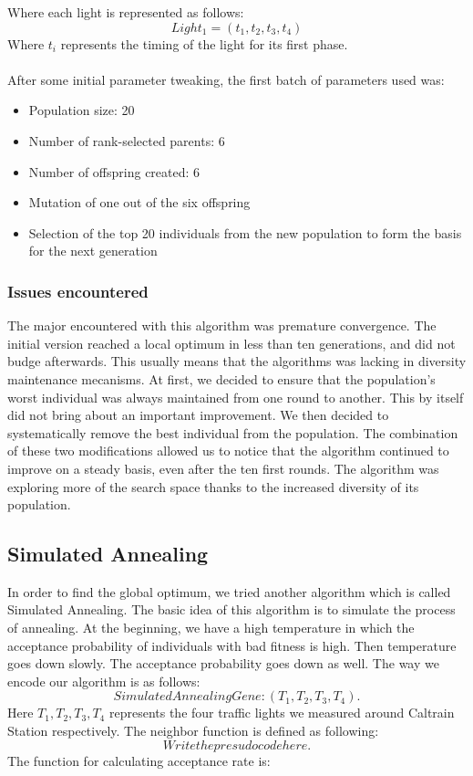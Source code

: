 \documentclass{article} %
\begin{document}
Where each light is represented as follows:
\begin{equation}
 Light_1 = (t_1, t_2, t_3, t_4)
\end{equation}
Where $t_i$ represents the timing of the light for its first phase. \\
$\;$\\
After some initial parameter tweaking, the first batch of parameters used was:
\begin{itemize}
 \item Population size: 20
 \item Number of rank-selected parents: 6
 \item Number of offspring created: 6
 \item Mutation of one out of the six offspring
 \item Selection of the top 20 individuals from the new population to form the basis for the next generation
\end{itemize}


\subsubsection{Issues encountered}
The major encountered with this algorithm was premature convergence. The initial version reached a local optimum in less than ten generations, and did not budge afterwards. This usually means that the algorithms was lacking in diversity maintenance mecanisms. At first, we decided to ensure that the population's worst individual was always maintained from one round to another. This by itself did not bring about an important improvement. 
We then decided to systematically remove the best individual from the population. The combination of these two modifications allowed us to notice that the algorithm continued to improve on a steady basis, even after the ten first rounds. The algorithm was exploring more of the search space thanks to the increased diversity of its population.


\subsection{Simulated Annealing}
In order to find the global optimum, we tried another algorithm which is called Simulated Annealing. The basic idea of this algorithm is to simulate the process of annealing. At the beginning, we have a high temperature in which the acceptance probability of individuals with bad fitness is high. Then temperature goes down slowly. The acceptance probability goes down as well. The way we encode our algorithm is as follows:
\begin{equation}
Simulated Annealing Gene:(T_1, T_2, T_3, T_4).
\end{equation}
Here $T_1, T_2, T_3, T_4$ represents the four traffic lights we measured around Caltrain Station respectively.
The neighbor function is defined as following:
\begin{equation}
Write the presudo code here.
\end{equation}
The function for calculating acceptance rate is:
\end{document}
